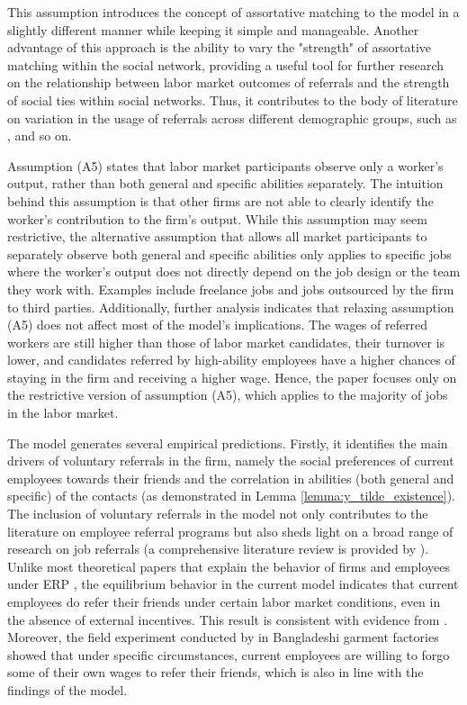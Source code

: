 \documentclass[12pt]{article}
\begin{document}
This assumption introduces the concept of assortative matching to the model in a slightly different manner while keeping it simple and manageable. Another advantage of this approach is the ability to vary the "strength" of assortative matching within the social network, providing a useful tool for further research on the relationship between labor market outcomes of referrals and the strength of social ties within social networks. Thus, it contributes to the body of literature on variation in the usage of referrals across different demographic groups, such as \cite{montgomery1994weak, granovetter1995getting, calvo2004effects, kuzubas2009endogenous, lester2021heterogeneous}, and so on.

Assumption (A5) states that labor market participants observe only a worker's output, rather than both general and specific abilities separately. The intuition behind this assumption is that other firms are not able to clearly identify the worker's contribution to the firm's output. While this assumption may seem restrictive, the alternative assumption that allows all market participants to separately observe both general and specific abilities only applies to specific jobs where the worker's output does not directly depend on the job design or the team they work with. Examples include freelance jobs and jobs outsourced by the firm to third parties. Additionally, further analysis indicates that relaxing assumption (A5) does not affect most of the model's implications. The wages of referred workers are still higher than those of labor market candidates, their turnover is lower, and candidates referred by high-ability employees have a higher chances of staying in the firm and receiving a higher wage. Hence, the paper focuses only on the restrictive version of assumption (A5), which applies to the majority of jobs in the labor market.

The model generates several empirical predictions. Firstly, it identifies the main drivers of voluntary referrals in the firm, namely the social preferences of current employees towards their friends and the correlation in abilities (both general and specific) of the contacts (as demonstrated in Lemma \ref{lemma:y_tilde_existence}). The inclusion of voluntary referrals in the model not only contributes to the literature on employee referral programs but also sheds light on a broad range of research on job referrals (a comprehensive literature review is provided by \cite{topa2011labor}). Unlike most theoretical papers that explain the behavior of firms and employees under ERP \citep{beaman2012gets, ekinci2016employee}, the equilibrium behavior in the current model indicates that current employees do refer their friends under certain labor market conditions, even in the absence of external incentives. This result is consistent with evidence from \cite{holzer1987hiring, granovetter1995getting, pellizzari2010friends, lester2021heterogeneous}. Moreover, the field experiment conducted by \cite{heath2018firms} in Bangladeshi garment factories showed that under specific circumstances, current employees are willing to forgo some of their own wages to refer their friends, which is also in line with the findings of the model.
\end{document}
